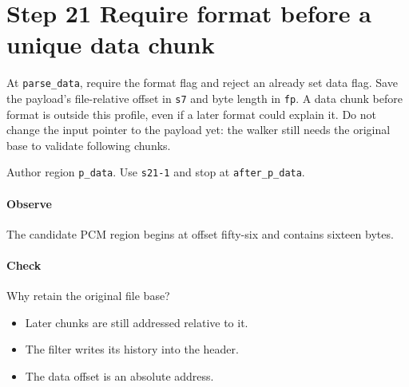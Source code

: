 \section{Step 21 Require format before a unique data chunk}\label{pcm-wav-s21}
At \texttt{parse\_data}, require the format flag and reject an already set data flag. Save the payload's file-relative offset in \texttt{s7} and byte length in \texttt{fp}. A data chunk before format is outside this profile, even if a later format could explain it. Do not change the input pointer to the payload yet: the walker still needs the original base to validate following chunks.

Author region \texttt{p\_data}. Use \texttt{s21-1} and stop at \texttt{after\_p\_data}.

\paragraph{Observe} The candidate PCM region begins at offset fifty-six and contains sixteen bytes.

\paragraph{Check} Why retain the original file base?
\begin{itemize}
\item[A.] Later chunks are still addressed relative to it.
\item[B.] The filter writes its history into the header.
\item[C.] The data offset is an absolute address.
\end{itemize}
